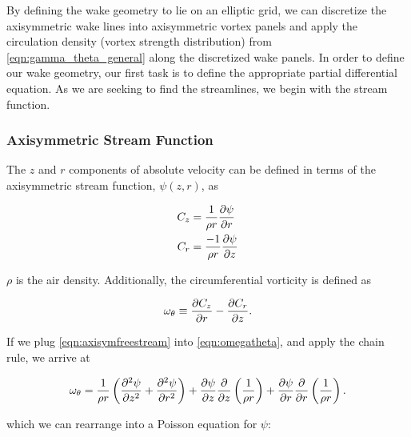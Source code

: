 By defining the wake geometry to lie on an elliptic grid, we can discretize the axisymmetric wake lines into axisymmetric vortex panels and apply the circulation density (vortex strength distribution) from \cref{eqn:gamma_theta_general} along the discretized wake panels.
%
In order to define our wake geometry, our first task is to define the appropriate partial differential equation.
%
As we are seeking to find the streamlines, we begin with the stream function.


\subsubsection{Axisymmetric Stream Function}

The \(z\) and \(r\) components of absolute velocity can be defined in terms of the axisymmetric stream function, \(\psi(z,r)\), as

\begin{subequations}
    \label{eqn:axisymfreestream}
    \begin{align}
        C_z &= \frac{1}{\rho r}\frac{\partial \psi}{\partial r} \\
        C_r &= \frac{-1}{\rho r}\frac{\partial \psi}{\partial z}
    \end{align}
\end{subequations}

\where \(\rho \) is the air density.
%
Additionally, the circumferential vorticity is defined as

\begin{equation}
    \label{eqn:omegatheta}
    \omega_\theta \equiv \frac{\partial C_z}{\partial r} - \frac{\partial C_r}{\partial z}.
\end{equation}

\noindent If we plug \cref{eqn:axisymfreestream} into \cref{eqn:omegatheta}, and apply the chain rule, we arrive at

\begin{equation}
    \omega_\theta = \frac{1}{\rho r} \left(\frac{\partial^2 \psi}{\partial z^2} + \frac{\partial^2 \psi}{\partial r^2} \right) + \frac{\partial \psi}{\partial z} \frac{\partial }{\partial z}\left( \frac{1}{\rho r} \right) + \frac{\partial \psi}{\partial r} \frac{\partial }{\partial r}\left( \frac{1}{\rho r} \right).
\end{equation}

\noindent which we can rearrange into a Poisson equation for \(\psi\):

